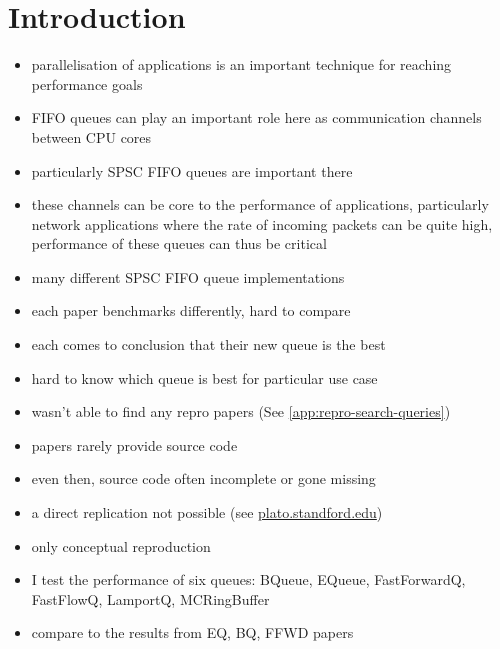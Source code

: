 \section{Introduction}
\begin{itemize}
    \item parallelisation of applications is an important technique for reaching performance goals
    \item FIFO queues can play an important role here as communication channels between CPU cores
    \item particularly SPSC FIFO queues are important there
    \item these channels can be core to the performance of applications, particularly network applications
        where the rate of incoming packets can be quite high, performance of these queues can thus be critical
    \item many different SPSC FIFO queue implementations
    \item each paper benchmarks differently, hard to compare
    \item each comes to conclusion that their new queue is the best
    \item hard to know which queue is best for particular use case
    \item wasn't able to find any repro papers (See \autoref{app:repro-search-queries})
    \item papers rarely provide source code
    \item even then, source code often incomplete or gone missing
    \item a direct replication not possible (see
            \href{https://plato.stanford.edu/entries/scientific-reproducibility/#:~:text=direct
                replication%
                conceptual%
                to%
        }{plato.standford.edu})
    \item only conceptual reproduction
    \item I test the performance of six queues: BQueue, EQueue, FastForwardQ, FastFlowQ, LamportQ, MCRingBuffer
        \cite{B-Queue}\cite{EQueue}\cite{FastForward}\cite{FastFlowGithub}\cite{Lamport}\cite{MCRingBuffer}
    \item compare to the results from EQ, BQ, FFWD papers

\end{itemize}
